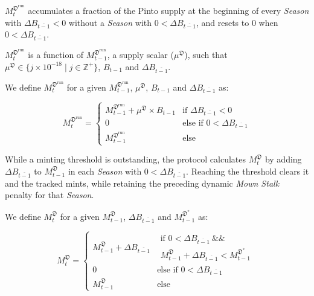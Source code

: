 \documentclass[tikz]{article}
\makeatletter
\newenvironment{keepunit}{%
  \par\penalty0\begingroup
  \edef\keepunitparskip{\the\parskip}%
  \noindent\begin{minipage}[t]{\linewidth}%
  \setlength{\parskip}{\keepunitparskip}%
  \@minipagefalse
}{%
  \end{minipage}\par\endgroup
}
\newcommand{\term}[1]{\textsl{#1}}
\makeatother
\begin{document}
$M_t^{\mathfrak{D}^{\text{run}}}$ accumulates a fraction of the Pinto supply at the beginning of every \term{Season} with $\Delta B_{\overline{t-1}}<0$ without a \term{Season} with $0<\Delta B_{\overline{t-1}}$, and resets to $0$ when $0<\Delta B_{\overline{t-1}}$.

$M_t^{\mathfrak{D}^{\text{run}}}$ is a function of $M_{t-1}^{\mathfrak{D}^{\text{run}}}$, a supply scalar ($\mu^{\mathfrak{D}}$), such that $\mu^{\mathfrak{D}} \in \{j \times 10^{-18} \mid j \in \mathbb{Z}^{+} \}$, $B_{t-1}$ and $\Delta B_{\overline{t-1}}$.

\begin{keepunit}
We define $M_t^{\mathfrak{D}^{\text{run}}}$ for a given $M_{t-1}^{\mathfrak{D}^{\text{run}}}$, $\mu^{\mathfrak{D}}$, $B_{t-1}$ and $\Delta B_{\overline{t-1}}$ as:

    $$
        M_t^{\mathfrak{D}^{\text{run}}} =
        \begin{cases}
            M_{t-1}^{\mathfrak{D}^{\text{run}}}+\mu^{\mathfrak{D}}\times B_{t-1} & \text{if }\Delta B_{\overline{t-1}}<0\\
            0 & \text{else if }0<\Delta B_{\overline{t-1}}\\
            M_{t-1}^{\mathfrak{D}^{\text{run}}} & \text{else}
        \end{cases}
    $$
\end{keepunit}

While a minting threshold is outstanding, the protocol calculates $M_t^{\mathfrak{D}}$ by adding $\Delta B_{\overline{t-1}}$ to $M_{t-1}^{\mathfrak{D}}$ in each \term{Season} with $0<\Delta B_{\overline{t-1}}$. Reaching the threshold clears it and the tracked mints, while retaining the preceding dynamic \term{Mown Stalk} penalty for that \term{Season}. 

\begin{keepunit}
We define $M_t^{\mathfrak{D}}$ for a given $M_{t-1}^{\mathfrak{D}}$, $\Delta B_{\overline{t-1}}$ and $M_{t-1}^{\mathfrak{D}^{*}}$ as:

    $$
        M_t^{\mathfrak{D}} =
        \begin{cases}
            M_{t-1}^{\mathfrak{D}}+\Delta B_{\overline{t-1}} & \begin{gathered}\text{if }0<\Delta B_{\overline{t-1}}\ \&\&\\M_{t-1}^{\mathfrak{D}}+\Delta B_{\overline{t-1}}<M_{t-1}^{\mathfrak{D}^{*}}\end{gathered}\\[2mm]
            0 & \text{else if }0<\Delta B_{\overline{t-1}}\\
            M_{t-1}^{\mathfrak{D}} & \text{else}
        \end{cases}
    $$
\end{keepunit}
\end{document}
